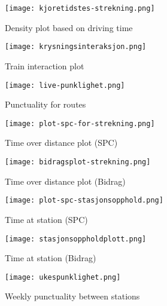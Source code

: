 
\begin{figure}[!htbp]
	\texttt{[image: kjoretidstes-strekning.png]}
	\caption[Density plot based on driving time]{Density plot based on driving time \cite{sintefPresis}}
	\label{fig:kjoretidstes-strekning}
\end{figure}
\pagebreak

\begin{figure}[!htbp]
	\texttt{[image: krysningsinteraksjon.png]}
	\caption[Train interaction plot]{Train interaction plot \cite{sintefPresis}}
	\label{fig:krysningsinteraksjon}
\end{figure}
\pagebreak

\begin{figure}[!htbp]
	\texttt{[image: live-punklighet.png]}
	\caption[Punctuality for routes]{Punctuality for routes \cite{sintefPresis}}
	\label{fig:live-punklighet}
\end{figure}
\pagebreak

\begin{figure}[!htbp]
	\texttt{[image: plot-spc-for-strekning.png]}
	\caption[Time over distance plot (SPC)]{Time over distance plot (SPC) \cite{sintefPresis}}
	\label{fig:plot-spc-for-strekning}
\end{figure}
\pagebreak

\begin{figure}[!htbp]
	\texttt{[image: bidragsplot-strekning.png]}
	\caption[Time over distance plot (Bidrag)]{Time over distance plot (Bidrag) \cite{sintefPresis}}
	\label{fig:bidragsplot-strekning}
\end{figure}
\pagebreak

\begin{figure}[!htbp]
	\texttt{[image: plot-spc-stasjonsopphold.png]}
	\caption[Time at station (SPC)]{Time at station (SPC) \cite{sintefPresis}}
	\label{fig:plot-spc-for-stasjonsopphold}
\end{figure}
\pagebreak

\begin{figure}[!htbp]
	\texttt{[image: stasjonsoppholdplott.png]}
	\caption[Time at station (Bidrag)]{Time at station (Bidrag) \cite{sintefPresis}}
	\label{fig:stasjonsoppholdplott}
\end{figure}
\pagebreak

\begin{figure}[!htbp]
	\texttt{[image: ukespunklighet.png]}
	\caption[Weekly punctuality between stations]{Weekly punctuality between stations \cite{sintefPresis}}
	\label{fig:ukespunklighet}
\end{figure}
\pagebreak
